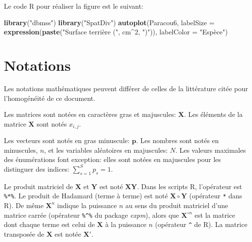 \documentclass[
  11pt,
  french,
  a4paper,
  extrafontsizes,onecolumn,openright
  ]{memoir}
\newenvironment{Shaded}{\begin{snugshade}}{\end{snugshade}}
\newcommand{\AttributeTok}[1]{\textcolor[rgb]{0.13,0.29,0.53}{#1}}
\newcommand{\DecValTok}[1]{\textcolor[rgb]{0.00,0.00,0.81}{#1}}
\newcommand{\FunctionTok}[1]{\textcolor[rgb]{0.13,0.29,0.53}{\textbf{#1}}}
\newcommand{\NormalTok}[1]{#1}
\newcommand{\SpecialCharTok}[1]{\textcolor[rgb]{0.81,0.36,0.00}{\textbf{#1}}}
\newcommand{\StringTok}[1]{\textcolor[rgb]{0.31,0.60,0.02}{#1}}
\newlength{\rf}
\begin{document}
\normalsize

Le code R pour réaliser la figure est le suivant:

\scriptsize

\begin{Shaded}
\begin{Highlighting}[]
\FunctionTok{library}\NormalTok{(}\StringTok{"dbmss"}\NormalTok{)}
\FunctionTok{library}\NormalTok{(}\StringTok{"SpatDiv"}\NormalTok{)}
\FunctionTok{autoplot}\NormalTok{(Paracou6, }\AttributeTok{labelSize =} \FunctionTok{expression}\NormalTok{(}\FunctionTok{paste}\NormalTok{(}\StringTok{"Surface terrière ("}\NormalTok{,}
\NormalTok{    cm}\SpecialCharTok{\^{}}\DecValTok{2}\NormalTok{, }\StringTok{")"}\NormalTok{)), }\AttributeTok{labelColor =} \StringTok{"Espèce"}\NormalTok{)}
\end{Highlighting}
\end{Shaded}

\normalsize

\chapter*{Notations}\label{notations}

Les notations mathématiques peuvent différer de celles de la littérature citée pour l'homogénéité de ce document.

Les matrices sont notées en caractères gras et majuscules: \(\mathbf{X}\).
Les éléments de la matrice \(\mathbf{X}\) sont notés \(x_{i,j}\).

Les vecteurs sont notés en gras minuscule: \(\mathbf{p}\).
Les nombres sont notés en minuscules, \(n\), et les variables aléatoires en majuscules: \(N\).
Les valeurs maximales des énumérations font exception: elles sont notées en majuscules pour les distinguer des indices: \(\sum_{s=1}^{S}{p_s}=1\).

Le produit matriciel de \(\mathbf{X}\) et \(\mathbf{Y}\) est noté \(\mathbf{X}\mathbf{Y}\). Dans les scripts R, l'opérateur est \texttt{\%*\%}.
Le produit de Hadamard (terme à terme) est noté \(\mathbf{X}\circ\mathbf{Y}\) (opérateur \texttt{*} dans R).
De même \(\mathbf{X}^n\) indique la puissance \(n\) au sens du produit matriciel d'une matrice carrée (opérateur \texttt{\%\^{}\%} du package \emph{expm}), alors que \(\mathbf{X}^{\circ n}\) est la matrice dont chaque terme est celui de \(\mathbf{X}\) à la puissance \(n\) (opérateur \texttt{\^{}} de R).
La matrice transposée de \(\mathbf{X}\) est notée \(\mathbf{X'}\).
\end{document}

